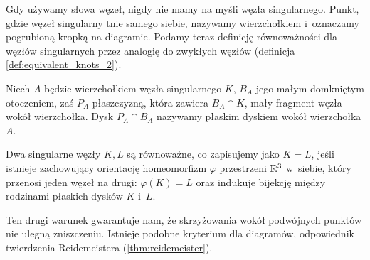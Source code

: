 Gdy używamy słowa węzeł, nigdy nie mamy na myśli węzła singularnego.
Punkt, gdzie węzeł singularny tnie samego siebie, nazywamy wierzchołkiem i~oznaczamy pogrubioną kropką na diagramie.
Podamy teraz definicję równoważności dla węzłów singularnych przez analogię do zwykłych węzłów (definicja \ref{def:equivalent_knots_2}).

\begin{definition}
    Niech $A$ będzie wierzchołkiem węzła singularnego $K$, $B_A$ jego małym domkniętym otoczeniem, zaś $P_A$ płaszczyzną, która zawiera $B_A \cap K$, mały fragment węzła wokół wierzchołka.
    Dysk $P_A \cap B_A$ nazywamy płaskim dyskiem wokół wierzchołka $A$.
\end{definition}

\begin{definition}
    Dwa singularne węzły $K, L$ są równoważne, co zapisujemy jako $K = L$, jeśli istnieje zachowujący orientację homeomorfizm $\varphi$ przestrzeni $\mathbb R^3$ w~siebie, który przenosi jeden węzeł na drugi: $\varphi(K) = L$ oraz indukuje bijekcję między rodzinami płaskich dysków $K$ i~$L$.
\end{definition}

Ten drugi warunek gwarantuje nam, że skrzyżowania wokół podwójnych punktów nie ulegną zniszczeniu.
Istnieje podobne kryterium dla diagramów, odpowiednik twierdzenia Reidemeistera (\ref{thm:reidemeister}).

